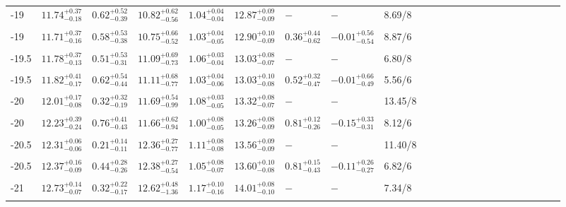 \documentclass[12pt, preprint]{aastex}
\begin{document}
\begin{table}
\begin{center}
\begin{tabular}{@{}lllllllllllllllllllllll}
-19 & $11.74^{+0.37}_{-0.18}$ &  $0.62^{+0.52}_{-0.39}$ & $10.82^{+0.62}_{-0.56}$ & $1.04^{+0.04}_{-0.04}$ &  $12.87^{+0.09}_{-0.09}$ & $-$ & $-$ & 8.69/8\\ \\

-19 & $11.71^{+0.37}_{-0.16}$ &  $0.58^{+0.53}_{-0.38}$ & $10.75^{+0.66}_{-0.52}$ & $1.03^{+0.04}_{-0.05}$ &  $12.90^{+0.10}_{-0.09}$ & $0.36^{+0.44}_{-0.62}$ & $-0.01^{+0.56}_{-0.54}$ & 8.87/6\\ \\


-19.5 & $11.78^{+0.37}_{-0.13}$ &  $0.51^{+0.53}_{-0.31}$ & $11.09^{+0.69}_{-0.73}$ & $1.06^{+0.03}_{-0.04}$ &  $13.03^{+0.08}_{-0.07}$ & $-$ & $-$ & 6.80/8\\ \\

-19.5 & $11.82^{+0.41}_{-0.17}$ &  $0.62^{+0.54}_{-0.44}$ & $11.11^{+0.68}_{-0.77}$ & $1.03^{+0.04}_{-0.06}$ &  $13.03^{+0.10}_{-0.08}$ & $0.52^{+0.32}_{-0.47}$ & $-0.01^{+0.66}_{-0.49}$ & 5.56/6\\ \\

-20 & $12.01^{+0.17}_{-0.08}$ &  $0.32^{+0.32}_{-0.19}$ & $11.69^{+0.54}_{-0.99}$ & $1.08^{+0.03}_{-0.05}$ &  $13.32^{+0.08}_{-0.07}$ & $-$ & $-$ & 13.45/8\\ \\

-20 & $12.23^{+0.39}_{-0.24}$ &  $0.76^{+0.41}_{-0.43}$ & $11.66^{+0.62}_{-0.94}$ & $1.00^{+0.08}_{-0.05}$ &  $13.26^{+0.08}_{-0.09}$ & $0.81^{+0.12}_{-0.26}$ & $-0.15^{+0.33}_{-0.31}$ & 8.12/6\\ \\

-20.5 & $12.31^{+0.06}_{-0.06}$ &  $0.21^{+0.14}_{-0.11}$ & $12.36^{+0.27}_{-0.77}$ & $1.11^{+0.08}_{-0.08}$ &  $13.56^{+0.09}_{-0.09}$ & $-$ & $-$ & 11.40/8\\ \\

-20.5 & $12.37^{+0.16}_{-0.09}$ &  $0.44^{+0.28}_{-0.26}$ & $12.38^{+0.27}_{-0.54}$ & $1.05^{+0.08}_{-0.07}$ &  $13.60^{+0.10}_{-0.08}$ & $0.81^{+0.15}_{-0.43}$ & $-0.11^{+0.26}_{-0.27}$ & 6.82/6\\ \\

-21 & $12.73^{+0.14}_{-0.07}$ &  $0.32^{+0.22}_{-0.17}$ & $12.62^{+0.48}_{-1.36}$ & $1.17^{+0.10}_{-0.16}$ &  $14.01^{+0.08}_{-0.10}$ & $-$ & $-$ & 7.34/8\\ \\


\end{tabular}
\end{center}
\end{table}
\end{document}
